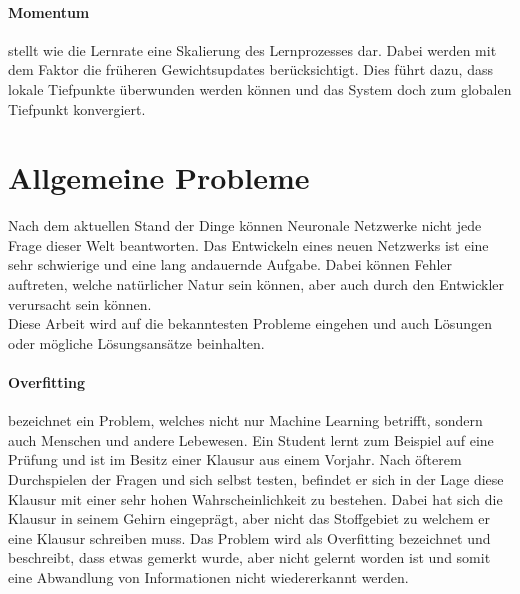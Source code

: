 \paragraph{Momentum} stellt wie die Lernrate eine Skalierung des Lernprozesses dar.
Dabei werden mit dem Faktor die früheren Gewichtsupdates berücksichtigt. 
Dies führt dazu, dass lokale Tiefpunkte überwunden werden können und das System doch zum globalen Tiefpunkt konvergiert.

\section{Allgemeine Probleme}
\label{sec:AllgeProb}

Nach dem aktuellen Stand der Dinge können Neuronale Netzwerke nicht jede Frage dieser Welt beantworten.
Das Entwickeln eines neuen Netzwerks ist eine sehr schwierige und eine lang andauernde Aufgabe. 
Dabei können Fehler auftreten, welche natürlicher Natur sein können, aber auch durch den Entwickler verursacht sein können. \\


\noindent
Diese Arbeit wird auf die bekanntesten Probleme eingehen und auch Lösungen oder mögliche Lösungsansätze beinhalten. 


\paragraph{Overfitting} bezeichnet ein Problem, welches nicht nur Machine Learning betrifft, sondern auch Menschen und andere Lebewesen. 
Ein Student lernt zum Beispiel auf eine Prüfung und ist im Besitz einer Klausur aus einem Vorjahr. 
Nach öfterem Durchspielen der Fragen und sich selbst testen, befindet er sich in der Lage diese Klausur mit einer sehr hohen Wahrscheinlichkeit zu bestehen. 
Dabei hat sich die Klausur in seinem Gehirn eingeprägt, aber nicht das Stoffgebiet zu welchem er eine Klausur schreiben muss. 
Das Problem wird als Overfitting bezeichnet und beschreibt, dass etwas gemerkt wurde, aber nicht gelernt worden ist und somit eine Abwandlung von Informationen nicht wiedererkannt werden.

